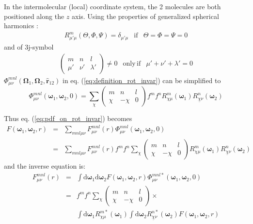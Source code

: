 In the intermolecular (local) coordinate system, the 2 molecules are
both positioned along the $z$ axis. Using the properties of generalized
spherical harmonics \citep{Edmonds,Gray-Gubbins,Messiah}:
\begin{equation}
\begin{array}{ccc}
R_{\mu'\mu}^{m}(\Theta,\Phi,\Psi)=\delta_{\mu'\mu} & \mathrm{if} & \Theta=\Phi=\Psi=0\end{array}
\end{equation}
and of 3j-symbol
\begin{eqnarray}
\left(\begin{array}{ccc}
m & n & l\\
\mu' & \nu' & \lambda'
\end{array}\right)\neq0 & \mathrm{only\,if} & \mu'+\nu'+\lambda'=0
\end{eqnarray}
 $\Phi_{\mu\nu}^{mnl}(\mathbf{\Omega}_{1},\mathbf{\Omega}_{2},\mathbf{\hat{r}}_{12})$
in eq. (\ref{eq:definition_rot_invar}) can be simplified to
\begin{equation}
\Phi_{\mu\nu}^{mnl}(\boldsymbol{\omega}_{1},\boldsymbol{\omega}_{2},0)=\sum_{\chi}\left(\begin{array}{ccc}
m & n & l\\
\chi & -\chi & 0
\end{array}\right)f^{m}f^{n}R_{\chi\mu}^{m}(\boldsymbol{\omega}_{1})R_{\underline{\chi}\nu}^{n}(\boldsymbol{\omega}_{2})\label{eq:phi_local}
\end{equation}

Thus eq. (\ref{eq:pdf_on_rot_invar}) becomes
\begin{eqnarray}
F(\boldsymbol{\omega}_{1},\boldsymbol{\omega}_{2},r) & = & \sum_{mnl\mu\nu}F_{\mu\nu}^{mnl}(r)\Phi_{\mu\nu}^{mnl}(\boldsymbol{\omega}_{1},\boldsymbol{\omega}_{2},0)\nonumber \\
 & = & \sum_{mnl\mu\nu}F_{\mu\nu}^{mnl}(r)f^{m}f^{n}\sum_{\chi}\left(\begin{array}{ccc}
m & n & l\\
\chi & -\chi & 0
\end{array}\right)R_{\chi\mu}^{m}(\boldsymbol{\omega}_{1})R_{\underline{\chi}\nu}^{n}(\boldsymbol{\omega}_{2})\label{eq:eq_total_local}
\end{eqnarray}
and the inverse equation is:
\begin{eqnarray}
F_{\mu\nu}^{mnl}(r) & = & \int\mathrm{d}\boldsymbol{\omega}_{1}\mathrm{d}\boldsymbol{\omega}_{2}F(\boldsymbol{\omega}_{1},\boldsymbol{\omega}_{2},r)\Phi_{\mu\nu}^{mnl*}(\boldsymbol{\omega}_{1},\boldsymbol{\omega}_{2},0)\nonumber \\
 & = & f^{m}f^{n}\sum_{\chi}\left(\begin{array}{ccc}
m & n & l\\
\chi & -\chi & 0
\end{array}\right)\times\nonumber \\
 &  & \int\mathrm{d}\boldsymbol{\omega}_{1}R_{\chi\mu}^{m*}(\boldsymbol{\omega}_{1})\int\mathrm{d}\boldsymbol{\omega}_{2}R_{\underline{\chi}\nu}^{n*}(\boldsymbol{\omega}_{2})F(\boldsymbol{\omega}_{1},\boldsymbol{\omega}_{2},r)
\end{eqnarray}

